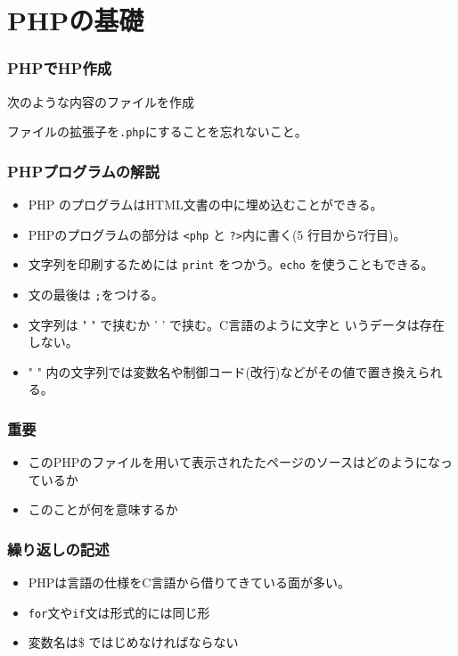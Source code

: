 

\frame{\maketitle}
\section{PHPの基礎}
\begin{frame}[containsverbatim]
 \frametitle{PHPでHP作成}
 次のような内容のファイルを作成

 ファイルの拡張子を\texttt{.php}にすることを忘れないこと。
\end{frame}
\begin{frame}[containsverbatim]
 \frametitle{PHPプログラムの解説}
\begin{itemize}
 \item PHP のプログラムはHTML文書の中に埋め込むことができる。
 \item PHPのプログラムの部分は \Verb+<php+ と \Verb+?>+内に書く(5
       行目から7行目)。
 \item 文字列を印刷するためには \texttt{print} をつかう。\texttt{echo}
       を使うこともできる。
 \item 文の最後は \texttt{;}をつける。
 \item  文字列は " " で挟むか ' ' で挟む。C言語のように文字と
        いうデータは存在しない。
 \item  " " 内の文字列では変数名や制御コード(改行)などがその値で置き換えられる。
\end{itemize}
\end{frame}
\begin{frame}[containsverbatim]
\frametitle{重要}
 \begin{itemize}
  \item このPHPのファイルを用いて表示されたたページのソースはどのようになっ
 ているか
  \item このことが何を意味するか
 \end{itemize}
\end{frame}
\begin{frame}[containsverbatim]
 \frametitle{繰り返しの記述}
 \begin{itemize}
  \item PHPは言語の仕様をC言語から借りてきている面が多い。
  \item \texttt{for}文や\texttt{if}文は形式的には同じ形
  \item 変数名は\$ ではじめなければならない
 \end{itemize}
\end{frame}
